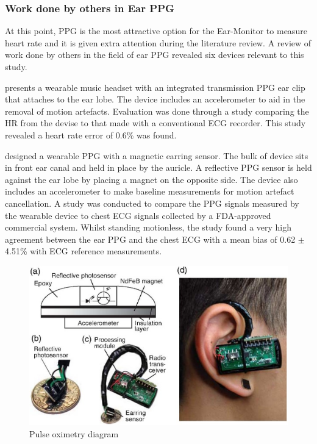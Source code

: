 \subsubsection{Work done by others in Ear PPG}
At this point, PPG is the most attractive option for the Ear-Monitor to measure heart rate and it is given extra attention during the literature review.  A review of work done by others in the field of ear PPG revealed six devices relevant to this study.

\medskip
\cite{shin2009novel} presents a wearable music headset with an integrated transmission PPG ear clip that attaches to the ear lobe. The device includes an accelerometer to aid in the removal of motion artefacts. Evaluation was done through a study comparing the HR from the devise to that made with a conventional ECG recorder. This study revealed a heart rate error of 0.6\% was found.

\medskip
\cite{poh2010motion} designed a wearable PPG with a magnetic earring sensor. The bulk of device sits in front ear canal and held in place by the auricle. A reflective PPG sensor is held against the ear lobe by placing a magnet on the opposite side. The device also includes an accelerometer to make baseline measurements for motion artefact cancellation. A study was conducted to compare the PPG signals measured by the wearable device to chest ECG signals collected by a FDA-approved commercial system. Whilst standing motionless, the study found a very high agreement between the ear PPG and the chest ECG with a mean bias of 0.62 $\pm$ 4.51\% with ECG reference measurements.

\medskip

\begin{figure}[h]
   \centering
   \includegraphics[scale=1.2]{figs/poh}
   \caption{Pulse oximetry diagram \citep{poh2010motion}}
   \label{fig:poh}
\end{figure}

